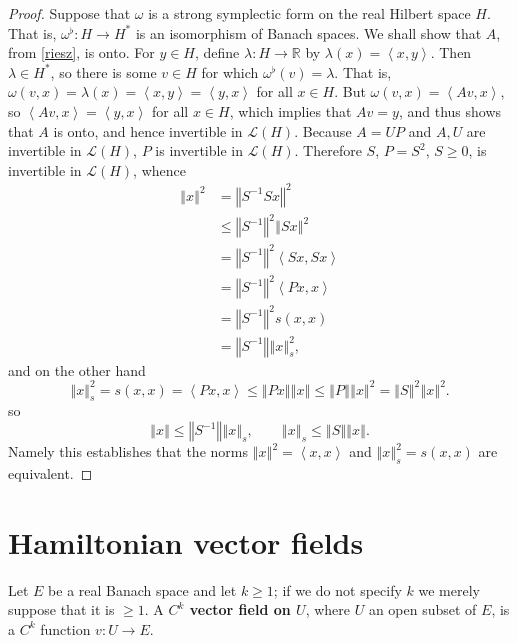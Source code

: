\documentclass{article}
\newcommand{\inner}[2]{\left\langle #1, #2 \right\rangle}
\newcommand{\norm}[1]{\left\Vert #1 \right\Vert}
\theoremstyle{definition}
\begin{document}
\begin{proof}
Suppose that $\omega$ is a strong symplectic form on the real Hilbert space $H$. 
That is, $\omega^\flat:H \to H^*$ is an isomorphism of Banach spaces. We shall show that
$A$, from \eqref{riesz}, is onto. For $y \in H$, define $\lambda:H \to \mathbb{R}$ by
$\lambda(x) = \inner{x}{y}$. Then $\lambda \in H^*$, so there is some
$v \in H$ for which $\omega^\flat(v)=\lambda$. That is,
$\omega(v,x)=\lambda(x)=\inner{x}{y}=\inner{y}{x}$ for all $x \in H$. 
But $\omega(v,x) = \inner{Av}{x}$, so 
$\inner{Av}{x}=\inner{y}{x}$ for all $x \in H$, which implies that $Av=y$, and thus shows that
$A$ is onto, and hence invertible in $\mathscr{L}(H)$. 
Because $A=UP$ and $A,U$ are invertible in $\mathscr{L}(H)$, $P$ is invertible
in $\mathscr{L}(H)$.
Therefore $S$, $P=S^2$, $S \geq 0$, is invertible in $\mathscr{L}(H)$, whence
\begin{align*}
\norm{x}^2 &= \norm{S^{-1} Sx}^2\\
&\leq \norm{S^{-1}}^2 \norm{Sx}^2\\
&=\norm{S^{-1}}^2 \inner{Sx}{Sx}\\
&=\norm{S^{-1}}^2 \inner{Px}{x}\\
&=\norm{S^{-1}}^2 s(x,x)\\
&=\norm{S^{-1}} \norm{x}_s^2,
\end{align*}
and on the other hand
\[
\norm{x}_s^2=s(x,x) = \inner{Px}{x} \leq \norm{Px} \norm{x} \leq \norm{P} \norm{x}^2=\norm{S}^2 \norm{x}^2.
\]
so
\[
\norm{x} \leq \norm{S^{-1}} \norm{x}_s, \qquad \norm{x}_s \leq 
\norm{S} \norm{x}.
\]
Namely this establishes that  the norms $\norm{x}^2 = \inner{x}{x}$ and
$\norm{x}_s^2 = s(x,x)$ are equivalent.
\end{proof}


\section{Hamiltonian vector fields}
Let $E$ be a real Banach space and let $k \geq 1$; if we do not specify $k$ we merely suppose that it is $\geq 1$.
A \textbf{$C^k$ vector field on $U$}, where $U$ an open subset of $E$, is a $C^k$ function $v:U \to E$.
\end{document}
